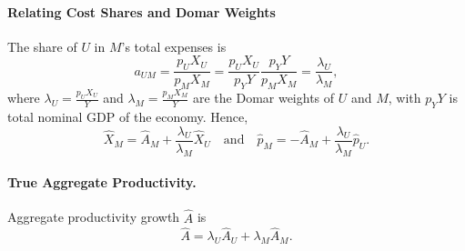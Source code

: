 \documentclass[11pt]{article}
\begin{document}
\paragraph{Relating Cost Shares and Domar Weights}
The share of $U$ in $M$'s total expenses is
\begin{equation*}
     a_{UM}  =  \frac{p_U X_U}{p_M X_M}  =  \frac{p_U X_U}{p_Y Y} \frac{p_Y Y}{p_M X_M} 
     =  \frac{\lambda_U}{\lambda_M},
\end{equation*}
where $\lambda_U = \tfrac{p_U X_U}{Y}$ and $\lambda_M = \tfrac{p_M X_M}{Y}$ are the Domar weights of $U$ and $M$, with $p_Y Y$ is total nominal GDP of the economy. Hence, 
\begin{equation*}
    \hat{X}_M = \hat{A}_M+\frac{\lambda_U}{\lambda_M} \hat{X}_U
    \quad\text{and}\quad
    \hat{p}_M = -\hat{A}_M+\frac{\lambda_U}{\lambda_M} \hat{p}_U.
\end{equation*}

\paragraph{True Aggregate Productivity.}
Aggregate productivity growth $\hat{A}$ is 
\begin{equation}
      \hat{A} 
     =  
    \lambda_U  \hat{A}_U  +  \lambda_M  \hat{A}_M.
\end{equation}
\end{document}
